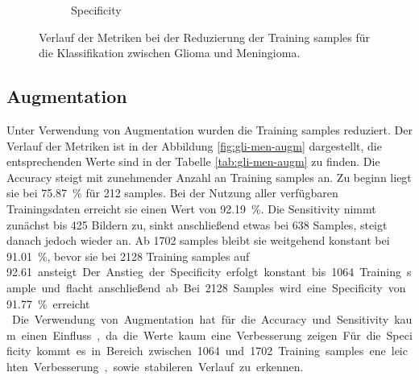 \begin{figure}[H]
\begin{subfigure}[b]{0.48\textwidth}
    \caption{Specificity}
    \label{fig:gli-men-spec}
  \end{subfigure}
  \caption{Verlauf der Metriken bei der Reduzierung der Training samples für die Klassifikation zwischen Glioma und Meningioma.}
  \label{fig:gli-men-reduktion}
\end{figure}
\subsection{Augmentation}
Unter Verwendung von Augmentation wurden die Training samples reduziert.
Der Verlauf der Metriken ist in der Abbildung \ref{fig:gli-men-augm} dargestellt,
die entsprechenden Werte sind in der Tabelle \ref{tab:gli-men-augm} zu finden.
Die Accuracy steigt mit zunehmender Anzahl an Training samples an.
Zu beginn liegt sie bei \SI{75.87}{\percent} für 212 samples. 
Bei der Nutzung aller verfügbaren Trainingsdaten erreicht sie einen Wert von \SI{92.19}{\percent}.
Die Sensitivity nimmt zunächst bis 425 Bildern zu, sinkt anschließend etwas bei 638 Samples, steigt danach jedoch wieder an.
Ab 1702 samples bleibt sie weitgehend konstant bei \SI{91.01}{\%}, bevor sie bei 2128 Training samples auf \SI{92.61} ansteigt. 
Der Anstieg der Specificity erfolgt konstant bis 1064 Training sample und flacht anschließend ab.
Bei 2128 Samples wird eine Specificity von \SI{91.77}{\%} erreicht.\\
Die Verwendung von Augmentation hat für die Accuracy und Sensitivity kaum einen Einfluss, da die Werte kaum eine Verbesserung zeigen.
Für die Specificity kommt es in Bereich zwischen 1064 und 1702 Training samples ene leichten Verbesserung, sowie stabileren Verlauf zu erkennen.
